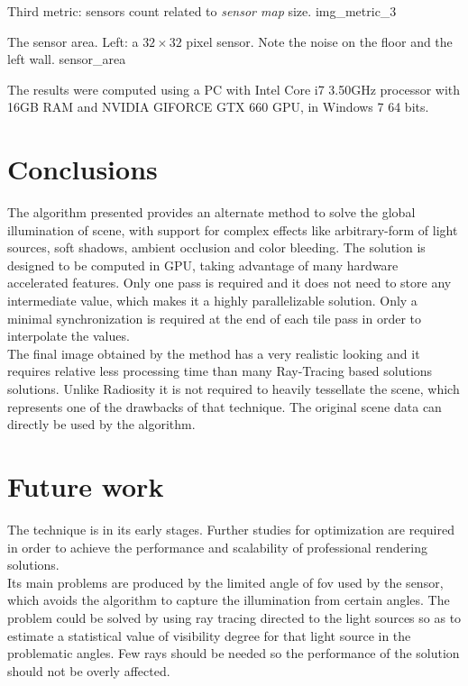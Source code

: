 \documentclass[10pt, conference]{IEEEtran}
\begin{document}
\subimages
	{Third metric: sensors count related to \emph{sensor map} size.}
	{img_metric_3}{
}


\subimages
	{The sensor area. Left: a $32 \times 32$ pixel sensor. Note the noise on the floor and the left wall.}
	{sensor_area}{
}

The results were computed using a PC with Intel Core i7 3.50GHz processor with 16GB RAM and NVIDIA GIFORCE GTX 660 GPU, in Windows 7 64 bits.


\section{Conclusions}
%
The algorithm presented provides an alternate method to solve the global illumination of scene, with support for complex effects like arbitrary-form of light sources, soft shadows, ambient occlusion and color bleeding. 
The solution is designed to be computed in GPU, taking advantage of many hardware accelerated features. 
Only one pass is required and it does not need to store any intermediate value, which makes it a highly parallelizable solution. 
Only a minimal synchronization is required at the end of each tile pass in order to interpolate the values.\\

The final image obtained by the method has a very realistic looking and it requires relative less processing time than many Ray-Tracing based solutions \cite{ray_tracing} solutions.
Unlike Radiosity \cite{radiosity} it is not required to heavily tessellate the scene, which represents one of the drawbacks of that technique. 
The original scene data can directly be used by the algorithm.


\section{Future work}
%
The technique is in its early stages. Further studies for optimization are required in order to achieve the performance and scalability of professional rendering solutions.\\

Its main problems are produced by the limited angle of fov used by the sensor, which avoids the algorithm to capture the illumination from certain angles. 
The problem could be solved by using ray tracing directed to the light sources so as to estimate a statistical value of visibility degree for that light source in the problematic angles. 
Few rays should be needed so the performance of the solution should not be overly affected.\\
\end{document}
